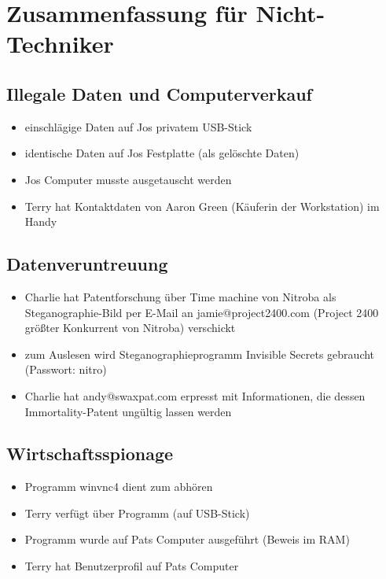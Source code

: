 \chapter{Zusammenfassung für Nicht-Techniker}
\label{sec:nicht_tec}

\section{Illegale Daten und Computerverkauf}
\label{sec:illegale_daten}
\begin{itemize}
	\item einschlägige Daten auf Jos privatem USB-Stick
	\item identische Daten auf Jos Festplatte (als gelöschte Daten)
	\item Jos Computer musste ausgetauscht werden
	\item Terry hat Kontaktdaten von Aaron Green (Käuferin der Workstation) im Handy
\end{itemize}

\section{Datenveruntreuung}
\label{sec:veruntreuung}
\begin{itemize}
	\item Charlie hat Patentforschung über Time machine von Nitroba als Steganographie-Bild per E-Mail an jamie@project2400.com (Project 2400 größter Konkurrent von Nitroba) verschickt
	\item zum Auslesen wird Steganographieprogramm Invisible Secrets gebraucht (Passwort: nitro)
	\item Charlie hat andy@swaxpat.com erpresst mit Informationen, die dessen Immortality-Patent ungültig lassen werden
\end{itemize}

\section{Wirtschaftsspionage}
\label{sec:spionage}
\begin{itemize}
	\item Programm winvnc4 dient zum abhören
	\item Terry verfügt über Programm (auf USB-Stick)
	\item Programm wurde auf Pats Computer ausgeführt (Beweis im RAM)
	\item Terry hat Benutzerprofil auf Pats Computer
\end{itemize}
